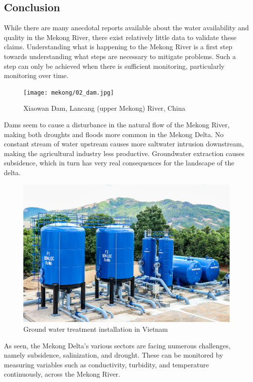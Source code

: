 



\newpage
\subsection{Conclusion}
While there are many anecdotal reports available about the water availability and quality in the Mekong River, there exist relatively little data to validate these claims. Understanding what is happening to the Mekong River is a first step towards understanding what steps are necessary to mitigate problems. Such a step can only be achieved when there is sufficient monitoring, particularly monitoring over time.\\

\begin{figure}[h]
\centering
\texttt{[image: mekong/02\_dam.jpg]}
\caption{Xiaowan Dam, Lancang (upper Mekong) River, China \cite{critnature}}
\end{figure}

Dams seem to cause a disturbance in the natural flow of the Mekong River, making both droughts and floods more common in the Mekong Delta. No constant stream of water upstream causes more saltwater intrusion downstream, making the agricultural industry less productive. Groundwater extraction causes subsidence, which in turn has very real consequences for the landscape of the delta.\\

\begin{figure}[h]
\centering
\includegraphics[scale=1]{mekong/01_groundwater.jpg}
\caption{Ground water treatment installation in Vietnam \cite{pernam}}
\end{figure}

As seen, the Mekong Delta's various sectors are facing numerous challenges, namely subsidence, salinization, and drought. These can be monitored by measuring variables such as conductivity, turbidity, and temperature continuously, across the Mekong River.

